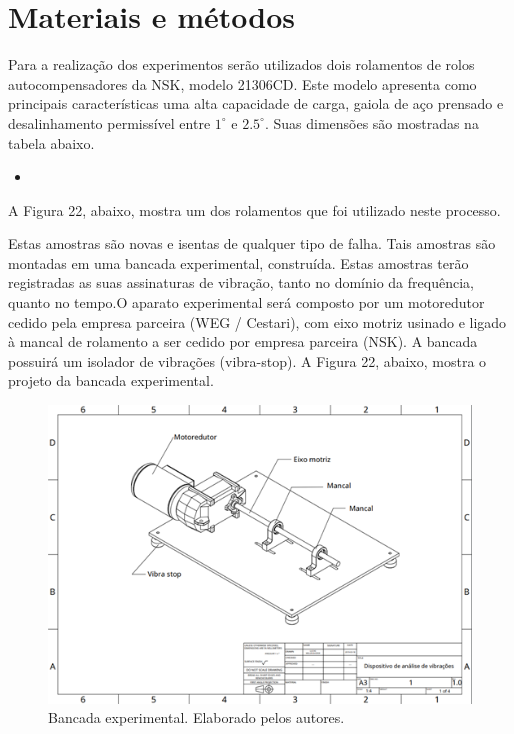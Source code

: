 \documentclass[
	12pt,				
	oneside,			
	a4paper,			
	english,			
	brazil				
	]{abntex2ppgsi}
\begin{document}
\chapter{Materiais e métodos}

Para a realização dos experimentos serão utilizados dois rolamentos de rolos autocompensadores da NSK, modelo 21306CD. Este modelo apresenta como principais características uma alta capacidade de carga, gaiola de aço prensado e desalinhamento permissível entre $1^{\circ}$ e $2.5^{\circ}$. Suas dimensões são mostradas na tabela abaixo.  

\begin{itemize}
	\item 
\end{itemize}

A Figura 22, abaixo, mostra um dos rolamentos que foi utilizado neste processo. 

Estas amostras são novas e isentas de qualquer tipo de falha. Tais amostras são montadas em uma bancada experimental, construída. Estas amostras terão registradas as suas assinaturas de vibração, tanto no domínio da frequência, quanto no tempo.O aparato experimental será composto por um motoredutor cedido pela empresa parceira (WEG / Cestari), com eixo motriz usinado e ligado à mancal de rolamento a ser cedido por empresa parceira (NSK). A bancada possuirá um isolador de vibrações (vibra-stop). A Figura 22, abaixo, mostra o projeto da bancada experimental.

\begin{figure}[!htb]
\centering
\includegraphics{Figura22}
\caption {Bancada experimental. Elaborado pelos autores.}
\label{Figura22}
\end{figure} 
\end{document}
